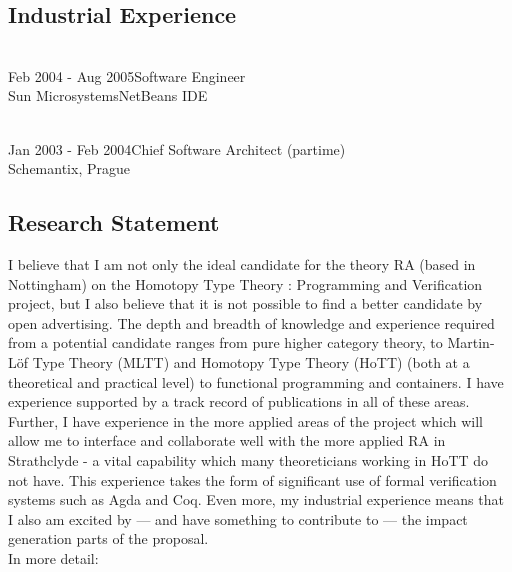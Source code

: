 \documentclass[a4paper]{article}
\newcommand{\project}{Homotopy Type Theory : Programming and Verification}
\newcommand{\mltt}{MLTT}
\begin{document}
\subsection*{Industrial Experience}
\vspace{-1em}
\begin{tabbing}
  \hspace{4cm}\=\\
  Feb 2004 - Aug 2005\>Software Engineer\\
  Sun Microsystems\>NetBeans IDE 
\end{tabbing}
\vspace{-2em}
\begin{tabbing}
\hspace{4cm}\=\\
Jan 2003 - Feb 2004\>Chief Software Architect (partime)\\
Schemantix, Prague
\end{tabbing}


\subsection*{Research Statement}
I believe that I am not only the ideal candidate for the theory RA
(based in Nottingham) on the {\project} project, but I also believe
that it is not possible to find a better candidate by open
advertising. The depth and breadth of knowledge and experience
required from a potential candidate ranges from pure higher category
theory, to Martin-L\"of Type Theory ({\mltt}) and Homotopy Type Theory
(HoTT) (both at a theoretical and practical level) to functional
programming and containers. I have experience supported by a track
record of publications in all of these areas. Further, I have
experience in the more applied areas of the project which will allow me
to interface and collaborate well with the more applied RA in
Strathclyde - a vital capability which many theoreticians working in
HoTT do not have. This experience takes the form of significant use of
formal verification systems such as Agda and Coq. Even more, my
industrial experience means that I also am excited by --- and have
something to contribute to --- the impact generation parts of the
proposal. \\[1ex]

\noindent In more detail:


\end{document}
